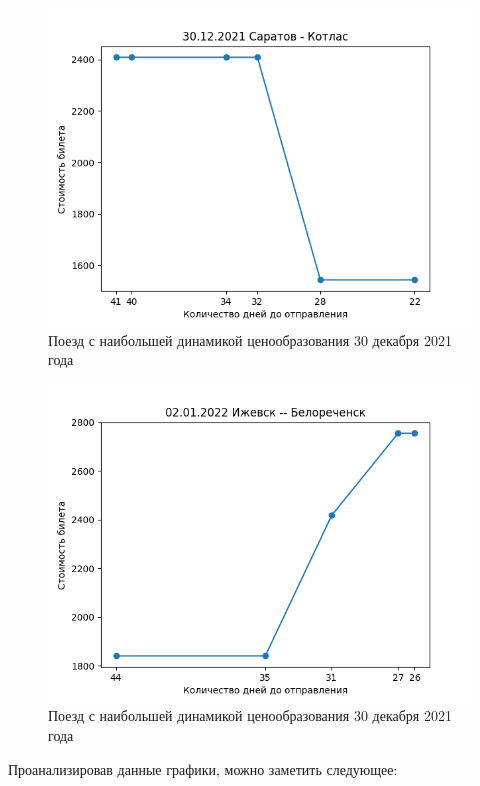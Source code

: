 \documentclass[conference]{IEEEtran}
\begin{document}
\begin{figure}[h!]
	\includegraphics[scale=0.5]{30122021}
	\caption{Поезд с наибольшей динамикой ценообразования 30 декабря 2021 года}
\end{figure}

\begin{figure}[h!]
	\includegraphics[scale=0.5]{02012022}
	\caption{Поезд с наибольшей динамикой ценообразования 30 декабря 2021 года}
\end{figure}

Проанализировав данные графики, можно заметить следующее:
\end{document}
